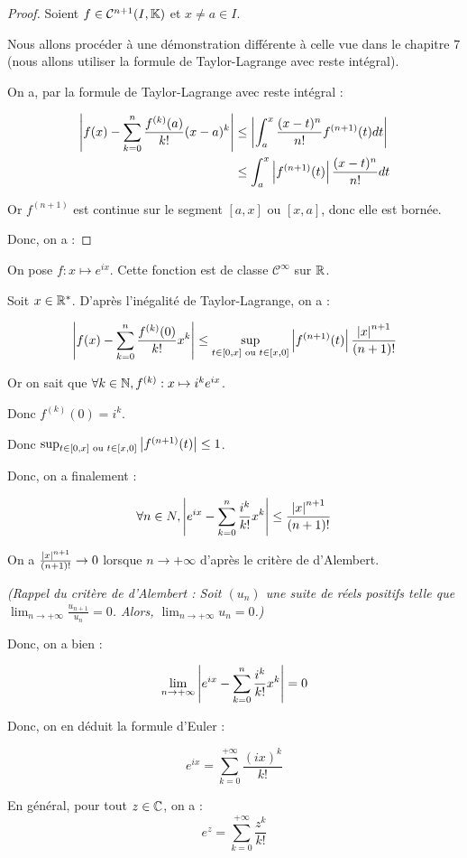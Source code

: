 \documentclass[12pt, a4paper]{report}
\begin{document}
\begin{proof}
    Soient $f\in\mathcal{C}^{n+1}(I,\mathbb{K})$ et $x\not=a \in I$.

    Nous allons procéder à une démonstration différente à celle vue dans le chapitre 7 (nous allons utiliser la formule de Taylor-Lagrange avec reste intégral).

    On a, par la formule de Taylor-Lagrange avec reste intégral :

    \begin{align*}
        \left|f(x)-\sum_{k=0}^n \frac{f^{(k)}(a)}{k!}(x-a)^k\right|&\le\left|\int_a^x \frac{(x-t)^n}{n!}f^{(n+1)}(t)dt\right|\\
        &\le \int_a^x \left|f^{(n+1)}(t)\right|\frac{(x-t)^n}{n!}dt\\
    \end{align*}

    Or $f^{(n+1)}$ est continue sur le segment $[a,x]$ ou $[x,a]$, donc elle est bornée.

    Donc, on a :

\end{proof}

\begin{application}
    On pose $f:x\mapsto e^{ix}$. Cette fonction est de classe $\mathcal{C}^\infty$ sur $\mathbb{R}$.

    Soit $x\in\mathbb{R}^*$. D'après l'inégalité de Taylor-Lagrange, on a :

    $$\left|f(x)-\sum_{k=0}^n \frac{f^{(k)}(0)}{k!} x^k\right| \le \sup_{t\in[0,x] \text{ ou } t\in[x,0]} \left|f^{(n+1)}(t)\right| \frac{\left|x\right|^{n+1}}{(n+1)!}$$

    Or on sait que $\forall k \in \mathbb{N}, f^{(k)}:x\mapsto i^k e^{ix}$.

    Donc $f^{(k)}(0) = i^k$.

    Donc $\sup_{t\in[0,x] \text{ ou } t\in[x,0]} \left|f^{(n+1)}(t)\right| \le 1$.

    Donc, on a finalement :

    $$\forall n \in N, \left|e^{ix}-\sum_{k=0}^n \frac{i^k}{k!} x^k\right| \le \frac{\left|x\right|^{n+1}}{(n+1)!}$$

    On a $\frac{\left|x\right|^{n+1}}{(n+1)!} \to 0$ lorsque $n \to +\infty$ d'après le critère de d'Alembert.

    \textit{(Rappel du critère de d'Alembert : Soit $(u_n)$ une suite de réels positifs telle que $\lim_{n\to +\infty} \frac{u_{n+1}}{u_n} = 0$. Alors, $\lim_{n\to +\infty} u_n = 0$.)}

    Donc, on a bien :

    $$\lim_{n \to +\infty} \left|e^{ix}-\sum_{k=0}^n \frac{i^k}{k!} x^k\right| = 0$$

    Donc, on en déduit la formule d'Euler :

    $$\boxed{e^{ix} = \sum_{k=0}^{+\infty} \frac{(ix)^k}{k!}}$$

    En général, pour tout $z\in\mathbb{C}$, on a :
    $$\boxed{e^{z} = \sum_{k=0}^{+\infty} \frac{z^k}{k!}}$$
\end{application}
\end{document}
